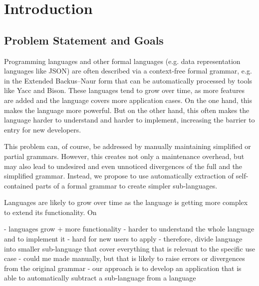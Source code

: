 
\chapter{Introduction}\label{cha:Introduction}

\section{Problem Statement and Goals}\label{sec:Aufgabenstellung}
Programming languages and other formal languages (e.g. data representation languages like JSON) are often described via a context-free formal grammar, e.g. in the Extended Backus–Naur form that can be automatically processed by tools like Yacc and Bison. These languages tend to grow over time, as more features are added and the language covers more application cases. On the one hand, this makes the language more powerful. But on the other hand, this often makes the language harder to understand and harder to implement, increasing the barrier to entry for new developers.

This problem can, of course, be addressed by manually maintaining simplified or partial grammars. However, this creates not only a maintenance overhead, but may also lead to undesired and even unnoticed divergences of the full and the simplified grammar. Instead, we propose to use automatically extraction of self-contained parts of a formal grammar to create simpler sub-languages.

Languages are likely to grow over time as the language is getting more complex to extend its functionality. On

- languages grow
+ more functionality
- harder to understand the whole language and to implement it
- hard for new users to apply
- therefore, divide language into smaller sub-language that cover everything that is relevant to the specific use case
- could me made manually, but that is likely to raise errors or divergences from the original grammar
- our approach is to develop an application that is able to automatically subtract a sub-language from a language


